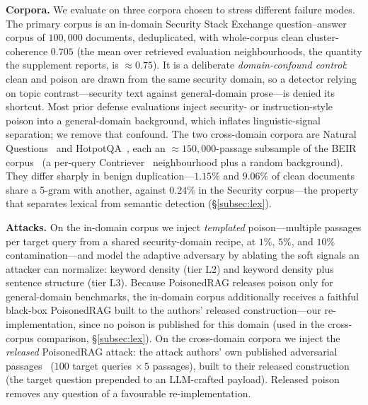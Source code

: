 \documentclass[10pt,journal,compsoc]{IEEEtran}
\begin{document}
\noindent\textbf{Corpora.} We evaluate on three corpora chosen to stress
different failure modes. The primary corpus is an in-domain Security Stack
Exchange question--answer corpus of $100{,}000$ documents, deduplicated, with
whole-corpus clean cluster-coherence $0.705$ (the mean over retrieved evaluation
neighbourhoods, the quantity the supplement reports, is $\approx\!0.75$).
It is a deliberate \emph{domain-confound control}: clean and poison are drawn from
the same security domain, so a detector relying on topic contrast---security text
against general-domain prose---is denied its shortcut. Most prior defense
evaluations inject security- or instruction-style poison into a general-domain
background, which inflates linguistic-signal separation; we remove that confound.
The two cross-domain corpora are Natural Questions~\cite{nq} and
HotpotQA~\cite{hotpotqa}, each an $\approx\!150{,}000$-passage subsample of the
BEIR corpus~\cite{beir} (a per-query Contriever~\cite{contriever} neighbourhood plus
a random background). They differ sharply in benign duplication---$1.15\%$ and $9.06\%$ of
clean documents share a 5-gram with another, against $0.24\%$ in the Security
corpus---the property that separates lexical from semantic detection
(\S\ref{subsec:lex}).

\noindent\textbf{Attacks.} On the in-domain corpus we inject \emph{templated}
poison---multiple passages per target query from a shared security-domain recipe,
at $1\%$, $5\%$, and $10\%$ contamination---and model the adaptive adversary by
ablating the soft signals an attacker can normalize: keyword density (tier L2) and
keyword density plus sentence structure (tier L3). Because PoisonedRAG releases
poison only for general-domain benchmarks, the in-domain corpus additionally
receives a faithful black-box PoisonedRAG built to the authors' released
construction---our re-implementation, since no poison is published for this domain (used in
the cross-corpus comparison, \S\ref{subsec:lex}). On the
cross-domain corpora we inject the \emph{released} PoisonedRAG attack: the attack
authors' own published
adversarial passages~\cite{poisonedrag} ($100$ target queries $\times\,5$
passages), built to their released construction (the target question prepended to
an LLM-crafted payload). Released poison removes any question of a favourable
re-implementation.
\end{document}
